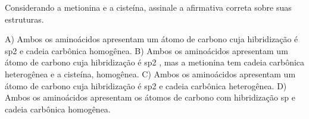 \documentclass[10pt]{scrartcl}
\begin{document}
\begin{exercise}[points=1]
Considerando a metionina e a cisteína, assinale a afirmativa correta sobre suas estruturas.

 \par


A) Ambos os aminoácidos apresentam um átomo de carbono
cuja hibridização é sp2
e cadeia carbônica homogênea.
B) Ambos os aminoácidos apresentam um átomo de carbono
cuja hibridização é sp2
, mas a metionina tem cadeia
carbônica heterogênea e a cisteína, homogênea.
C) Ambos os aminoácidos apresentam um átomo de carbono
cuja hibridização é sp2
e cadeia carbônica heterogênea.
D) Ambos os aminoácidos apresentam os átomos de carbono
com hibridização sp e cadeia carbônica homogênea.
\end{exercise}
\begin{solution}

\end{solution}








\end{document}
